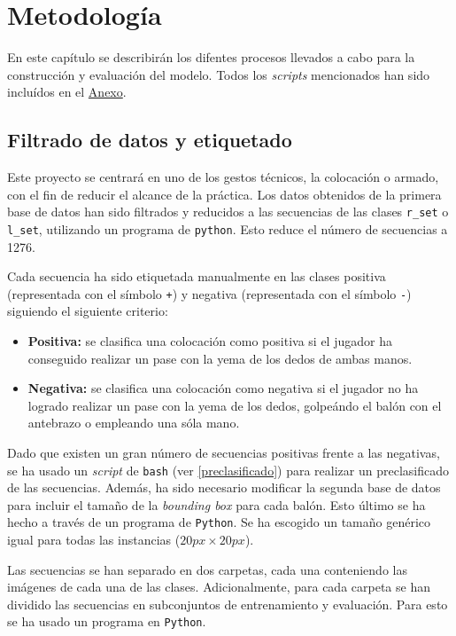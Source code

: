 \documentclass[12pt]{report} %
\begin{document}
    \chapter{Metodología}
    \label{chap:metodologia}
    En este capítulo se describirán los difentes procesos llevados a cabo para la construcción y evaluación del modelo. Todos los \textit{scripts} mencionados han sido incluídos en el \hyperref[anexo]{Anexo}.

    \section{Filtrado de datos y etiquetado}

    Este proyecto se centrará en uno de los gestos técnicos, la colocación o
    armado, con el fin de reducir el alcance de la práctica. Los datos obtenidos
    de la primera base de datos han sido filtrados y reducidos a las secuencias
    de las clases \verb!r_set! o \verb!l_set!, utilizando un programa de
    \verb!python!. Esto reduce el número de
    secuencias a 1276.

    Cada secuencia ha sido etiquetada manualmente en las clases positiva
    (representada con el símbolo \verb!+!) y negativa (representada con el
    símbolo \verb!-!) siguiendo el siguiente criterio:
    \begin{itemize}
        \item \textbf{Positiva:} se clasifica una colocación como positiva si
        el jugador ha conseguido realizar un pase con la yema de los dedos de
        ambas manos.
        \item \textbf{Negativa:} se clasifica una colocación como negativa si
        el jugador no ha logrado realizar un pase con la yema de los dedos,
        golpeándo el balón con el antebrazo o empleando una sóla mano.
    \end{itemize}
    
    Dado que existen un gran número de secuencias positivas frente a las
    negativas, se ha usado un \textit{script} de \texttt{bash} (ver
    \ref{preclasificado}) para realizar un preclasificado de las secuencias.
    Además, ha sido necesario modificar la segunda base de datos para incluir
    el tamaño de la \textit{bounding box} para cada balón. Esto último se ha
    hecho a través de un programa de \texttt{Python}. Se ha escogido un 
    tamaño genérico igual para todas las instancias ($20px\times20px$).

    Las secuencias se han separado en dos carpetas, cada una conteniendo las
    imágenes de cada una de las clases. Adicionalmente, para cada carpeta se
    han dividido las secuencias en subconjuntos de entrenamiento y evaluación.
    Para esto se ha usado un programa en \texttt{Python}.
\end{document}
